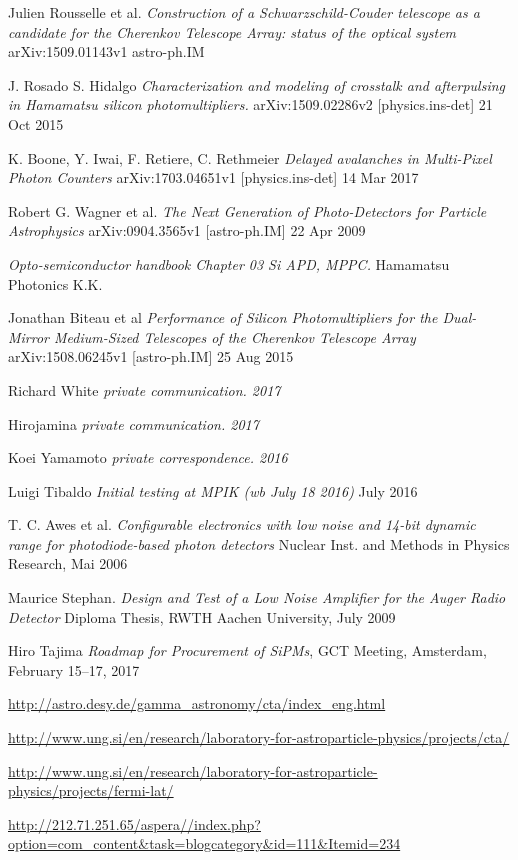 \documentclass[12pt,article,type=msc,colorback,accentcolor=tud9c]{tudthesis}
\begin{document}
\begin{thebibliography}{12}
 Julien Rousselle et al. \textit{Construction of a Schwarzschild-Couder telescope as a candidate for the Cherenkov Telescope Array: status of the optical system}  arXiv:1509.01143v1 astro-ph.IM

 J. Rosado S. Hidalgo \textit{Characterization and modeling of crosstalk and afterpulsing in Hamamatsu silicon photomultipliers.} arXiv:1509.02286v2 [physics.ins-det] 21 Oct 2015

 K. Boone, Y. Iwai, F. Retiere, C. Rethmeier \textit{Delayed avalanches in Multi-Pixel Photon Counters} arXiv:1703.04651v1 [physics.ins-det] 14 Mar 2017

 Robert G. Wagner et al. \textit{The Next Generation of Photo-Detectors for Particle Astrophysics} arXiv:0904.3565v1 [astro-ph.IM] 22 Apr 2009

 \textit{Opto-semiconductor handbook Chapter 03 Si APD, MPPC.} Hamamatsu Photonics K.K.

 Jonathan Biteau et al \textit{Performance of Silicon Photomultipliers for the Dual-Mirror Medium-Sized Telescopes of the Cherenkov Telescope Array} arXiv:1508.06245v1 [astro-ph.IM] 25 Aug 2015

 Richard White \textit{private communication. 2017}

 Hirojamina \textit{private communication. 2017}

 Koei Yamamoto \textit{private correspondence. 2016}

 Luigi Tibaldo \textit{Initial testing at MPIK (wb July 18 2016)} July 2016

 T. C. Awes et al. \textit{Configurable electronics with low noise and 14-bit dynamic range for photodiode-based photon detectors} Nuclear Inst. and Methods in Physics Research,  Mai 2006

 Maurice Stephan. \textit{Design and Test of a Low Noise Amplifier for the Auger Radio Detector} Diploma Thesis, RWTH Aachen University, July 2009

 Hiro Tajima \textit{Roadmap for Procurement of SiPMs}, GCT Meeting, Amsterdam, February 15–17, 2017

\url{http://astro.desy.de/gamma_astronomy/cta/index_eng.html}

\url{http://www.ung.si/en/research/laboratory-for-astroparticle-physics/projects/cta/}

\url{http://www.ung.si/en/research/laboratory-for-astroparticle-physics/projects/fermi-lat/}

\url{http://212.71.251.65/aspera//index.php?option=com_content&task=blogcategory&id=111&Itemid=234}

\end{thebibliography}
\end{document}
